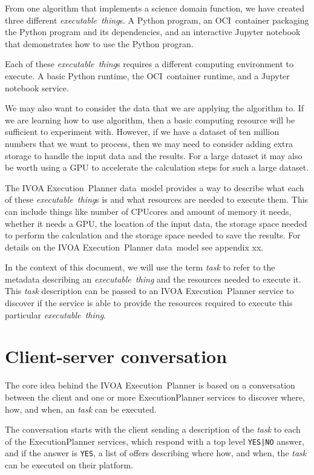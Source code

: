 \documentclass[11pt,a4paper]{ivoa}
\newcommand{\datamodel} {data~model}
\newcommand{\ivoa} {IVOA}
\newcommand{\execplanner} {ExecutionPlanner}
\newcommand{\executionplanner} {Execution~Planner}
\newcommand{\jupyter} {Jupyter}
\newcommand{\python} {Python}
\newcommand{\ocicontainer} {OCI~container}
\newcommand{\codeword}[1] {\texttt{#1}}
\newcommand{\dataset} {dataset}
\newcommand{\executablething} {\textit{executable~thing}}
\newcommand{\excutabletask} {\textit{task}}
\newcommand{\cpu} {CPU}
\newcommand{\gpu} {GPU}
\begin{document}
From one algorithm that implements a science domain function, we have created three different \executablething{}s.
A \python{} program, an \ocicontainer{} packaging the \python{} program and its dependencies, and an interactive \jupyter{} notebook
that demonstrates how to use the \python{} progran.

Each of these \executablething{}s requires a different computing environment to execute.
A basic \python{} runtime, the \ocicontainer{} runtime, and a \jupyter{} notebook service.

We may also want to consider the data that we are applying the algorithm to.
If we are learning how to use algorithm, then a basic computing resource will be sufficient
to experiment with.
However, if we have a \dataset{} of ten million numbers that we want to process, then we may
need to consider adding extra storage to handle the input data and the results.
For a large \dataset{} it may also be worth using a \gpu{} to accelerate the calculation steps
for such a large \dataset{}.

The \ivoa{} \executionplanner{} \datamodel{} provides a way to describe what each of these \executablething{}s
is and what resources are needed to execute them.
This can include things like number of \cpu cores and amount of memory it needs,
whether it needs a \gpu{}, the location of the input data, the storage space needed to perform
the calculation and the storage space needed to save the results.
For details on the \ivoa{} \executionplanner{} \datamodel{} see appendix xx.

In the context of this document, we will use the term \excutabletask{} to refer to the metadata
describing an \executablething{} and the resources needed to execute it.
This \excutabletask{} description can be passed to an \ivoa{} \executionplanner{} service to
discover if the service is able to provide the resources required to execute this particular
\executablething{}.

\section{Client-server conversation}
\label{sec:conversation}

The core idea behind the \ivoa{} \executionplanner{} is based on a conversation between the client
and one or more \execplanner{} services to discover where, how, and when, an \excutabletask{} can be
executed.

The conversation starts with the client sending a description of the \excutabletask{} to each of the
\execplanner{} services, which respond with a top level \codeword{YES|NO} answer, and if
the answer is \codeword{YES}, a list of offers describing where how, and when, the \excutabletask{}
can be executed on their platform.
\end{document}

